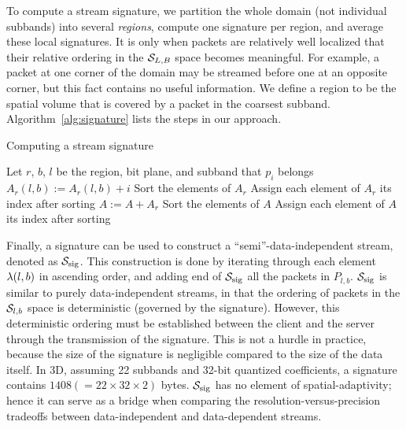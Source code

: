 To compute a stream signature, we partition the whole domain (not individual
subbands) into several \emph{regions}, compute one signature per region, and
average these local signatures. It is only when packets are relatively well
localized that their relative ordering in the $\strm_{L,B}$ space becomes
meaningful. For example, a packet at one corner of the domain may be streamed
before one at an opposite corner, but this fact contains no useful information.
We define a region to be the spatial volume that is covered by a packet in the
coarsest subband. Algorithm~\ref{alg:signature} lists the steps in our
approach.

\begin{algorithm}[h]
  \small
  \caption{Computing a stream signature}
  \begin{algorithmic}[1]
			\State Let $r$, $b$, $l$ be the region, bit plane, and subband that $p_i$ belongs
			\State $A_r(l,b) := A_r(l,b)+i$
		\EndFor
			\State Sort the elements of $A_r$
			\State Assign each element of $A_r$ its index after sorting
			\State $A := A+A_r$
		\EndFor
		\State Sort the elements of $A$
		\State Assign each element of $A$ its index after sorting
	\end{algorithmic}
	\label{alg:signature}
\end{algorithm}

Finally, a signature can be used to construct a ``semi''-data-independent
stream, denoted as $\ssig$. This construction is done by iterating through
each element $\sgn(l,b)$ in ascending order, and adding end of $\ssig$ all the
packets in $P_{l,b}$. $\ssig$ is similar to purely data-independent streams,
in that the ordering of packets in the $\strm_{l,b}$ space is deterministic
(governed by the signature). However, this deterministic ordering must be
established between the client and the server through the transmission of the
signature. This is not a hurdle in practice, because the size of the signature
is negligible compared to the size of the data itself. In 3D, assuming
22 subbands and 32-bit quantized coefficients, a signature contains $1408
(=22\times 32\times 2)$ bytes. $\ssig$ has no element of spatial-adaptivity;
hence it can serve as a bridge when comparing the resolution-versus-precision
tradeoffs between data-independent and data-dependent streams.
